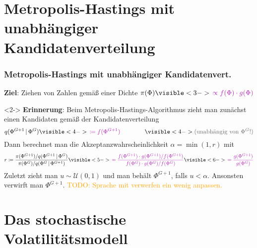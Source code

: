 \documentclass[10pt]{beamer}
\theoremstyle{definition}
\newcommand{\Uniform}{\mathcal{U}} %
\newcommand{\TODO}[1]{\textcolor{orange}{TODO: #1}}
\newcommand{\typeInfo}[1]{\textcolor{TypeInfoColor}{#1}}
\newcommand{\variant}[1]{\textcolor{VariantColor}{#1}}
\begin{document}

\section[Unabhängiger Metropolis-Hastings-Algorithmus]{Metropolis-Hastings mit unabhängiger Kandidatenverteilung}

\begin{frame}
  \frametitle{Metropolis-Hastings mit unabhängiger Kandidatenvert.}

  \textbf{Ziel}: Ziehen von Zahlen gemäß einer Dichte
  $
    \pi(\Phi)
    \visible<3->{\variant{\,\propto f(\Phi) \cdot g(\Phi)}}
  $

  \visible<3->{\variant{(wobei $f$ eine wohlbekannte Wahrscheinlichkeitsdichte ist)}}

  \vspace{10pt}

  \begin{visibleenv}<2->
    \textbf{Erinnerung}: Beim Metropolis-Hastings-Algorithmus zieht man zunächst einen Kandidaten gemäß der Kandidatenverteilung
    \[
      q(\Phi^{G+1} \,|\, \Phi^G)
      \visible<4->{\,\variant{\coloneqq f(\Phi^{G+1})}}
      \qquad\qquad
      \visible<4->{\typeInfo{\text{(unabhängig von $\Phi^G$!)}}}
    \]
    Dann berechnet man die Akzeptanzwahrscheinlichkeit $\alpha = \min(1, r)$ mit
    \[
      r \coloneqq \frac{\pi(\Phi^{G+1}) / q(\Phi^{G+1} \,|\, \Phi^G)}{\pi(\Phi^G) / q(\Phi^G \,|\, \Phi^{G+1})}
      \visible<5->{\variant{\, = \frac{f(\Phi^{G+1}) \cdot g(\Phi^{G+1}) / f(\Phi^{G+1})}{f(\Phi^{G}) \cdot g(\Phi^{G}) / f(\Phi^{G})}}}
      \visible<6->{\variant{\, = \frac{g(\Phi^{G+1})}{g(\Phi^G)}}}
    \]
    Zuletzt zieht man $u \sim \Uniform(0, 1)$ und man behält $\Phi^{G+1}$, falls $u < \alpha$. Ansonsten verwirft man $\Phi^{G+1}$.
    \TODO{Sprache mit verwerfen ein wenig anpassen.}
  \end{visibleenv}
\end{frame}


\section[Stoch. Volatilitätsmodell]{Das stochastische Volatilitätsmodell}
\end{document}
